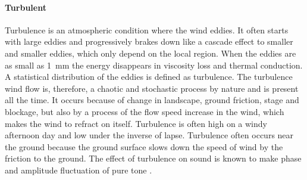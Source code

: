 \paragraph{Turbulent} Turbulence is an atmospheric condition where the wind eddies. It often starts with large eddies and progressively brakes down like a cascade effect to smaller and smaller eddies, which only depend on the local region. When the eddies are as small as \SI{1}{\milli\meter} the energy disappears in viscosity loss and thermal conduction. A statistical distribution of the eddies is defined as turbulence. The turbulence wind flow is, therefore, a chaotic and stochastic process by nature and is present all the time. It occurs because of change in landscape, ground friction, stage and blockage, but also by a process of the flow speed increase in the wind, which makes the wind to refract on itself. Turbulence is often high on a windy afternoon day and low under the inverse of lapse. Turbulence often occurs near the ground because the ground surface slows down the speed of wind by the friction to the ground. The effect of turbulence on sound is known to make phase and amplitude fluctuation of pure tone \citep{review_of_sound}.










